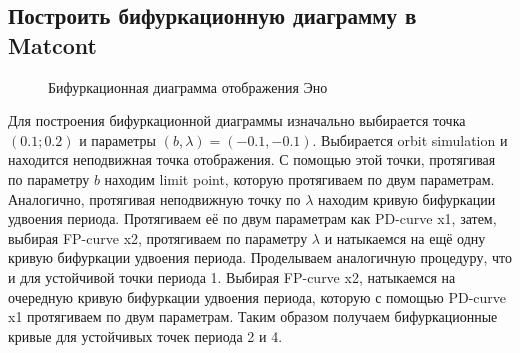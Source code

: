 \documentclass[12pt, a4paper]{article}
\begin{document}
\subsection{Построить бифуркационную диаграмму в Matcont}
\begin{figure}[H]
	\caption{Бифуркационная диаграмма отображения Эно}
\end{figure}

Для построения бифуркационной диаграммы изначально выбирается точка $(0.1; 0.2)$ и параметры $(b, \lambda) = (-0.1, -0.1)$. Выбирается orbit simulation и находится неподвижная точка отображения. С помощью этой точки, протягивая по параметру $b$ находим limit point, которую протягиваем по двум параметрам. Аналогично, протягивая неподвижную точку по $\lambda$ находим кривую бифуркации удвоения периода. Протягиваем её по двум параметрам как PD-curve x1, затем, выбирая FP-curve x2, протягиваем по параметру $\lambda$ и натыкаемся на ещё одну кривую бифуркации удвоения периода. Проделываем аналогичную процедуру, что и для устойчивой точки периода 1. Выбирая FP-curve x2, натыкаемся на очередную кривую бифуркации удвоения периода, которую с помощью PD-curve x1 протягиваем по двум параметрам. Таким образом получаем бифуркационные кривые для устойчивых точек периода 2 и 4.
\end{document}

